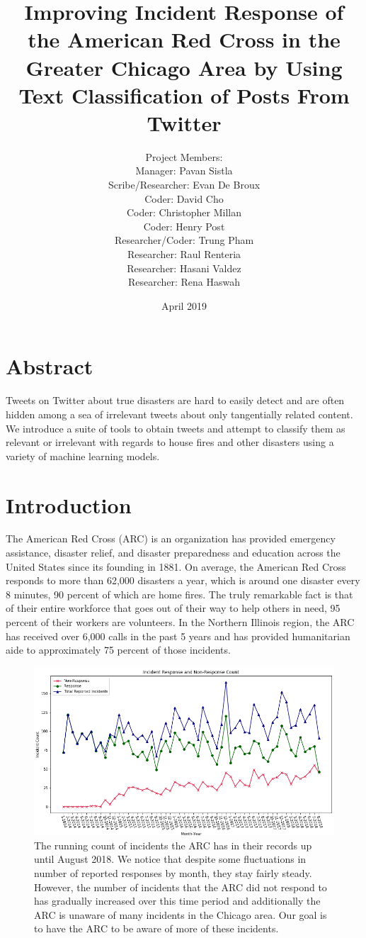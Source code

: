 \documentclass[titlepage, 12pt]{article}
\title{Improving Incident Response of the American Red Cross in the Greater Chicago Area by Using Text Classification of Posts From Twitter}
\author{Project Members: 
\\ Manager: Pavan Sistla 
\\ Scribe/Researcher: Evan De Broux 
\\ Coder: David Cho 
\\ Coder: Christopher Millan 
\\Coder: Henry Post 
\\ Researcher/Coder: Trung Pham 
\\ Researcher: Raul Renteria 
\\ Researcher: Hasani Valdez 
\\ Researcher: Rena Haswah
}
\date{April 2019}
\begin{document}
\maketitle
\newpage
\tableofcontents
\newpage

\section{Abstract}
\hspace{0.5 cm}Tweets on Twitter about true disasters are hard to easily detect and are often hidden among a sea of irrelevant tweets about only tangentially related content. We introduce a suite of tools to obtain tweets and attempt to classify them as relevant or irrelevant with regards to house fires and other disasters using a variety of machine learning models. 

\section{Introduction}

\hspace{0.5 cm}The American Red Cross (ARC) is an organization has provided emergency assistance, disaster relief, and disaster preparedness and education across the United States since its founding in 1881. On average, the American Red Cross responds to more than 62,000 disasters a year, which is around one disaster every 8 minutes, 90 percent of which are home fires. The truly remarkable fact is that of their entire workforce that goes out of their way to help others in need, 95 percent of their workers are volunteers. In the Northern Illinois region, the ARC has received over 6,000 calls in the past 5 years and has provided humanitarian aide to approximately 75 percent of those incidents.

\begin{figure}[h!]
\centering
\includegraphics[scale=0.5]{pics/in_response.png}
\caption{The running count of incidents the ARC has in their records up until August 2018. We notice that despite some fluctuations in number of reported responses by month, they stay fairly steady. However, the number of incidents that the ARC did not respond to has gradually increased over this time period and additionally the ARC is unaware of many incidents in the Chicago area. Our goal is to have the ARC to be aware of more of these incidents.}
\label{fig:incident_response}
\end{figure}
\end{document}

